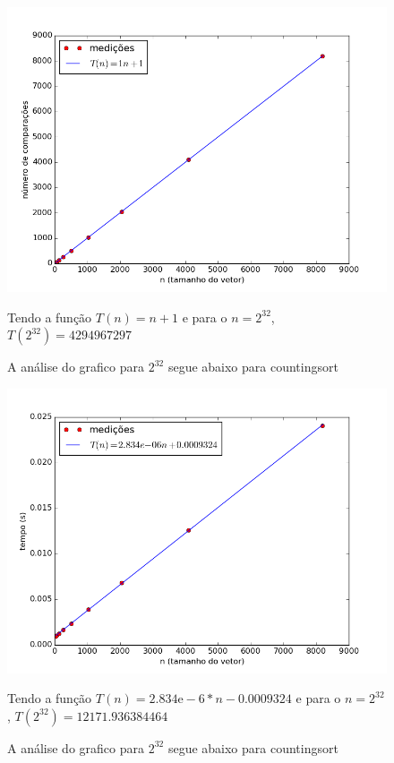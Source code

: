 \documentclass[12pt,a4paper,twoside]{report}
\begin{document}
\begin{figure}[ht]
\centering \includegraphics[scale=0.8]{../countingsort/imagens/countingsortDecrescente1.png}
\caption{A análise do grafico para $2^{32}$ segue abaixo para countingsort}

Tendo a função $T(n) = n+1 $ e para o $n =2^{32}$, $T(2^{32}) = 4294967297$ 
\label{fig:countingsortDecrescente1}
\end{figure}




\begin{figure}[ht]
\centering \includegraphics[scale=0.8]{../countingsort/imagens/countingsortQuaseCresc100.png}
\caption{A análise do grafico para $2^{32}$ segue abaixo para countingsort}

Tendo a função $T(n) = 2.834\mathrm{e}-6*n-0.0009324$ e para o $n =2^{32}$, $T(2^{32}) = 12171.936384464$ 
\label{fig:countingsortQuaseCresc100}
\end{figure}
\end{document}
